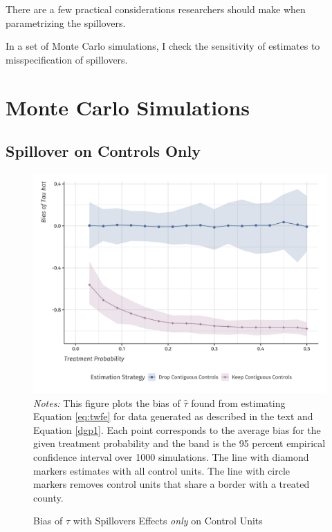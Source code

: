 \documentclass[11pt]{article}
\begin{document}
There are a few practical considerations researchers should make when parametrizing the spillovers. 

In a set of Monte Carlo simulations, I check the sensitivity of estimates to misspecification of spillovers.




\section{Monte Carlo Simulations}
\label{sec:monte_carlo}

\subsection{Spillover on Controls Only}

\begin{figure}[tb!]
    \caption{Bias of $\hat{\tau}$ with Spillovers Effects \emph{only} on Control Units}
    \label{fig:bias_as_treat_prob}
    {\centering
        \includegraphics[width=\textwidth]{../../figures/figure-bias_fix.png}
    } 
    {\footnotesize
        \textit{Notes:} This figure plots the bias of $\hat{\tau}$ found from estimating Equation \ref{eq:twfe} for data generated as described in the text and Equation \ref{dgp1}. Each point corresponds to the average bias for the given treatment probability and the band is the 95 percent empirical confidence interval over 1000 simulations. The line with diamond markers estimates with all control units. The line with circle markers removes control units that share a border with a treated county. 
    }
\end{figure}
\end{document}
